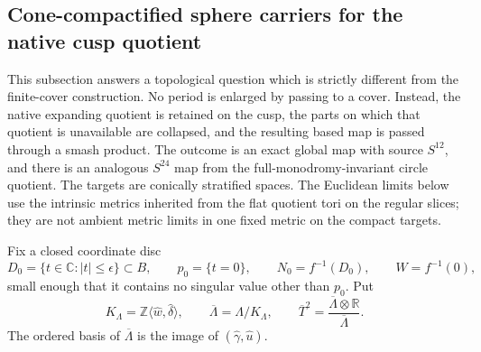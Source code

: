 \subsection{Cone-compactified sphere carriers for the native cusp quotient}
\label{cusp-cone-section}

This subsection answers a topological question which is strictly different
from the finite-cover construction.  No period is enlarged by passing to a
cover.  Instead, the native expanding quotient is retained on the cusp, the
parts on which that quotient is unavailable are collapsed, and the resulting
based map is passed through a smash product.  The outcome is an exact global
map with source \(S^{12}\), and there is an analogous \(S^{24}\) map from the
full-monodromy-invariant circle quotient.  The targets are conically
stratified spaces.  The Euclidean limits below use the intrinsic metrics
inherited from the flat quotient tori on the regular slices; they are not
ambient metric limits in one fixed metric
on the compact targets.

Fix a closed coordinate disc
\begin{equation}
 D_0=\{t\in\mathbb C:|t|\leq\epsilon\}\subset B,\qquad
 p_0=\{t=0\},\qquad N_0=f^{-1}(D_0),\qquad W=f^{-1}(0),
 \label{cusp-cone-disc}
\end{equation}
small enough that it contains no singular value other than \(p_0\).  Put
\begin{equation}
 K_\Lambda=\mathbb Z\langle\widehat w,\widehat\delta\rangle,\qquad
 \overline\Lambda=\Lambda/K_\Lambda,\qquad
 \overline T^2=
 \frac{\overline\Lambda\otimes\mathbb R}{\overline\Lambda}.
 \label{cusp-cone-quotient-lattice}
\end{equation}
The ordered basis of \(\overline\Lambda\) is the image of
\((\widehat\gamma,\widehat u)\).

